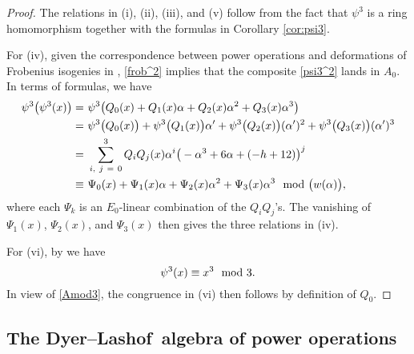 \documentclass{gtpart}
\theoremstyle{definition}
\theoremstyle{remark}
\newcommand{\DL}{Dyer--Lashof~}
\newcommand{\md}{~~{\rm mod}~}
\newcommand{\A}{\alpha}
\newcommand{\p}{\psi^3}
\begin{document}
\begin{proof}
 The relations in (i), (ii), (iii), and (v) follow from the fact that $\p$ is a ring homomorphism together with the formulas in Corollary \ref{cor:psi3}.  

 For (iv), given the correspondence between power operations and deformations of Frobenius isogenies in \cite[Theorem B]{cong}, 
 \eqref{frob^2} implies that the composite \eqref{psi3^2} lands in $A_0$.  In terms of formulas, we have 
 \begin{equation*}
 \begin{split}
  \p \big( \p(x) \big) = & ~ \p \big( Q_0(x) + Q_1(x) \A + Q_2(x) \A^2 + Q_3(x) \A^3 \big) \\
                       = & ~ \p \big( Q_0(x) \big) + \p \big( Q_1(x) \big) \A' + \p \big( Q_2(x) \big) (\A')^2 + \p \big( Q_3(x) \big) (\A')^3 \\
                       = & ~ \sum_{i,~j~=~0}^3 Q_iQ_j(x) \A^i \big( -\A^3 + 6 \A + (-h + 12) \big)^j \\
                  \equiv & ~ \Psi_0(x) + \Psi_1(x) \A + \Psi_2(x) \A^2 + \Psi_3(x) \A^3 \md \big( w(\A) \big), 
 \end{split}
 \end{equation*}
 where each $\Psi_k$ is an $E_0$-linear combination of the $Q_iQ_j$'s.  
 The vanishing of $\Psi_1(x)$, $\Psi_2(x)$, and $\Psi_3(x)$ then gives the three relations in (iv).  

 For (vi), by \cite[Propositions 3.25 and 10.5]{cong} we have 
 \[
  \p(x) \equiv x^3 \md 3.  
 \]
 In view of \eqref{Amod3}, the congruence in (vi) then follows by definition of $Q_0$.  
\end{proof}


\subsection{The \DL algebra of power operations}
\end{document}
